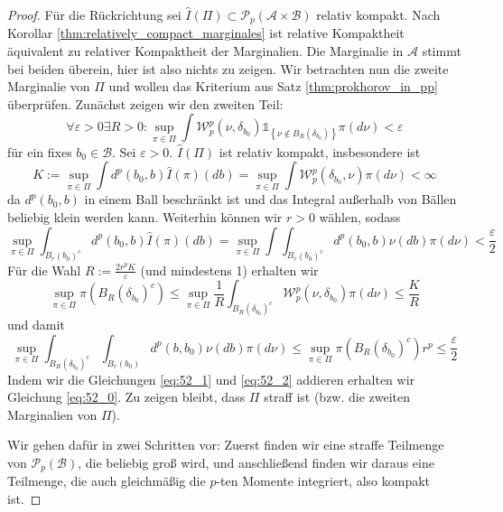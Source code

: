 \begin{proof}
    Für die Rückrichtung sei $\hat{I}(\Pi) \subset \mathcal{P}_p(\mathcal{A}\times \mathcal{B})$ relativ kompakt. Nach Korollar \ref{thm:relatively_compact_marginales} ist relative Kompaktheit äquivalent zu relativer Kompaktheit der Marginalien. Die Marginalie in $\mathcal{A}$ stimmt bei beiden überein, hier ist also nichts zu zeigen. Wir betrachten nun die zweite Marginalie von $\Pi$ und wollen das Kriterium aus Satz \ref{thm:prokhorov_in_pp} überprüfen. Zunächst zeigen wir den zweiten Teil:
    \begin{equation}\label{eq:52_0}
        \forall \varepsilon > 0 \exists R>0: \sup_{\pi \in \Pi} \int \mathcal{W}_p^p(\nu, \delta_{b_0}) \mathds{1}_{\left\{\nu \notin B_R(\delta_{b_0})\right\}} \pi(d\nu)< \varepsilon
    \end{equation}
    für ein fixes $b_0 \in \mathcal{B}$. Sei $\varepsilon > 0$. $\hat{I}(\Pi)$ ist relativ kompakt, insbesondere ist 
    $$K:=\sup_{\pi \in \Pi} \int d^p(b_0, b) \hat{I}(\pi)(db) = \sup_{\pi \in \Pi} \int \mathcal{W}_p^p(\delta_{b_0}, \nu) \pi(d\nu) < \infty$$
    da $d^p(b_0, b)$ in einem Ball beschränkt ist und das Integral außerhalb von Bällen beliebig klein werden kann. Weiterhin können wir $r>0$ wählen, sodass
    \begin{equation}\label{eq:52_1}
        \sup_{\pi \in \Pi} \int_{B_r(b_0)^c} d^p(b_0, b) \hat{I}(\pi)(db) = \sup_{\pi \in \Pi} \int \int_{B_r(b_0)^c}d^p(b_0, b) \nu(db) \pi(d\nu) < \frac{\varepsilon}{2}
    \end{equation}
    Für die Wahl $R:=\frac{2r^pK}{\varepsilon}$ (und mindestens 1) erhalten wir 
    $$\sup_{\pi \in \Pi} \pi(B_R(\delta_{b_0})^c) \leq \sup_{\pi \in \Pi} \frac{1}{R} \int_{B_R(\delta_{b_0})^c} \mathcal{W}_p^p(\nu, \delta_{b_0})\pi(d\nu) \leq \frac{K}{R}$$
    und damit
    \begin{equation}\label{eq:52_2}
        \sup_{\pi \in \Pi} \int_{B_R(\delta_{b_0})^c} \int_{B_r(b_0)} d^p(b, b_0)\nu(db)\pi(d\nu) \leq \sup_{\pi\in\Pi} \pi(B_R(\delta_{b_0})^c) r^p \leq \frac{\varepsilon}{2}
    \end{equation}
    Indem wir die Gleichungen \ref{eq:52_1} und \ref{eq:52_2} addieren erhalten wir Gleichung \ref{eq:52_0}. Zu zeigen bleibt, dass $\Pi$ straff ist (bzw. die zweiten Marginalien von $\Pi$).

    Wir gehen dafür in zwei Schritten vor: Zuerst finden wir eine straffe Teilmenge von $\mathcal{P}_p(\mathcal{B})$, die beliebig groß wird, und anschließend finden wir daraus eine Teilmenge, die auch gleichmäßig die $p$-ten Momente integriert, also kompakt ist.


\end{proof}
